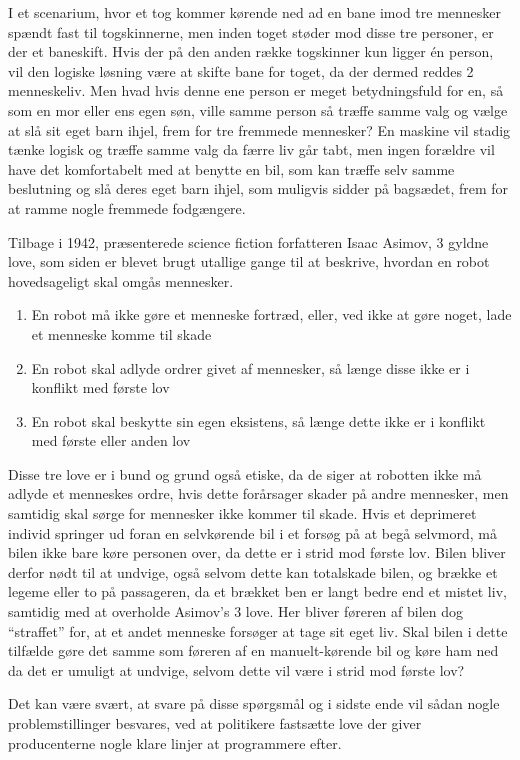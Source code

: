 	I et scenarium, hvor et tog kommer kørende ned ad en bane imod tre mennesker spændt fast til togskinnerne, men inden toget støder mod disse tre personer, er der et baneskift. Hvis der på den anden række togskinner kun ligger \'en person, vil den logiske løsning være at skifte bane for toget, da der dermed reddes 2 menneskeliv. Men hvad hvis denne ene person er meget betydningsfuld for en, så som en mor eller ens egen søn, ville samme person så træffe samme valg og vælge at slå sit eget barn ihjel, frem for tre fremmede mennesker? En maskine vil stadig tænke logisk og træffe samme valg da færre liv går tabt, men ingen forældre vil have det komfortabelt med at benytte en bil, som kan træffe selv samme beslutning og slå deres eget barn ihjel, som muligvis sidder på bagsædet, frem for at ramme nogle fremmede fodgængere.
	
	Tilbage i 1942, præsenterede science fiction forfatteren Isaac Asimov, 3 gyldne love\cite{Asimov}, som siden er blevet brugt utallige gange til at beskrive, hvordan en robot hovedsageligt skal omgås mennesker.
	
	\begin{enumerate}
		
		\item En robot må ikke gøre et menneske fortræd, eller, ved ikke at gøre noget, lade et menneske komme til skade
		\item En robot skal adlyde ordrer givet af mennesker, så længe disse ikke er i konflikt med første lov
		\item En robot skal beskytte sin egen eksistens, så længe dette ikke er i konflikt med første eller anden lov
		
	\end{enumerate}
	
	Disse tre love er i bund og grund også etiske, da de siger at robotten ikke må adlyde et menneskes ordre, hvis dette forårsager skader på andre mennesker, men samtidig skal sørge for mennesker ikke kommer til skade. Hvis et deprimeret individ springer ud foran en selvkørende bil i et forsøg på at begå selvmord, må bilen ikke bare køre personen over, da dette er i strid mod første lov. Bilen bliver derfor nødt til at undvige, også selvom dette kan totalskade bilen, og brække et legeme eller to på passageren, da et brækket ben er langt bedre end et mistet liv, samtidig med at overholde Asimov's 3 love. Her bliver føreren af bilen dog ``straffet'' for, at et andet menneske forsøger at tage sit eget liv. Skal bilen i dette tilfælde gøre det samme som føreren af en manuelt-kørende bil og køre ham ned da det er umuligt at undvige, selvom dette vil være i strid mod første lov? 

	Det kan være svært, at svare på disse spørgsmål og i sidste ende vil sådan nogle problemstillinger besvares, ved at politikere fastsætte love der giver producenterne nogle klare linjer at programmere efter.